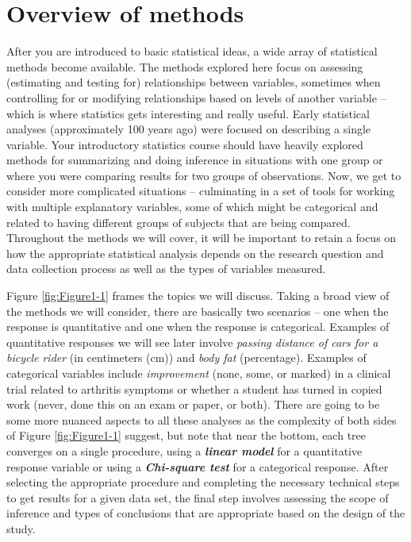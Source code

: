 \documentclass[
]{book}
\begin{document}
\hypertarget{section1-1}{%
\section{Overview of methods}\label{section1-1}}

After you are introduced to basic statistical ideas, a wide array of statistical methods become
available. The methods explored here focus on assessing (estimating and testing
for) relationships between variables, sometimes when controlling for or
modifying relationships based on levels of another variable -- which is where statistics gets interesting and really useful. Early statistical analyses (approximately 100 years ago) were
focused on describing a single variable. Your introductory statistics course
should have heavily explored methods for summarizing and doing inference in
situations with one group or where you were comparing results for two groups of
observations. Now, we get to consider more complicated situations -- culminating
in a set of tools for working with multiple explanatory variables, some of
which might be categorical and related to having different groups of subjects
that are being compared. Throughout the methods we will cover, it will be
important to retain a focus on how the appropriate statistical analysis depends
on the research question and data collection process as well as the types of
variables measured.

\indent Figure \ref{fig:Figure1-1} frames the topics we will discuss. Taking a broad
view of the methods we will consider,
there are basically two scenarios -- one when the response is quantitative and
one when the response is categorical. Examples of quantitative responses we will
see later involve \emph{passing distance of cars for a bicycle rider} (in centimeters (cm)) and \emph{body fat} (percentage).
Examples of categorical variables include \emph{improvement} (none, some, or marked)
in a clinical trial related to arthritis symptoms or whether a student has turned in copied work
(never, done this on an exam or paper, or both). There are going to be some more
nuanced aspects to all these analyses as the complexity of both sides of Figure
\ref{fig:Figure1-1} suggest, but note that near the bottom, each tree converges
on a single
procedure, using a \textbf{\emph{linear model}}  for a quantitative response variable or
using a \textbf{\emph{Chi-square test}} for a categorical response.  After selecting the
appropriate procedure and completing the necessary technical steps to get results
for a
given data set, the final step involves assessing the scope of inference
 and
types of conclusions that are appropriate based on the design of the study.
\end{document}
